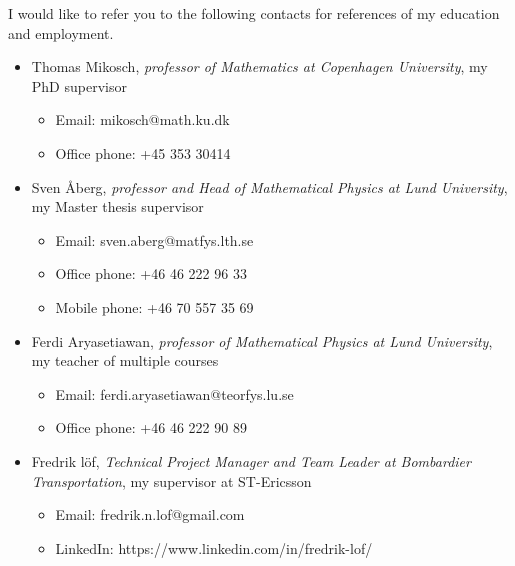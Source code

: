 \documentclass[12pt]{article}
\begin{document}
\maketitle

I would like to refer you to the following contacts for references of
my education and employment.
\begin{itemize}
\item Thomas Mikosch, {\em professor of Mathematics at Copenhagen
    University}, my PhD supervisor
  \begin{itemize}
  \item Email: mikosch@math.ku.dk
  \item Office phone: +45 353 30414
  \end{itemize}
\item Sven \AA berg, {\em professor and Head of Mathematical Physics
    at Lund University}, my Master thesis supervisor
  \begin{itemize}
  \item Email: sven.aberg@matfys.lth.se
  \item Office phone: +46 46 222 96 33
  \item Mobile phone: +46 70 557 35 69
  \end{itemize}
\item Ferdi Aryasetiawan, {\em professor of Mathematical Physics at
    Lund University}, my teacher of multiple courses
  \begin{itemize}
  \item Email: ferdi.aryasetiawan@teorfys.lu.se
  \item Office phone: +46 46 222 90 89
  \end{itemize}
\item Fredrik l\"of, {\em Technical Project Manager and Team Leader at
    Bombardier Transportation}, my supervisor at ST-Ericsson
  \begin{itemize}
  \item Email: fredrik.n.lof@gmail.com
  \item LinkedIn: https://www.linkedin.com/in/fredrik-lof/
  \end{itemize}
\end{itemize}
\end{document}
